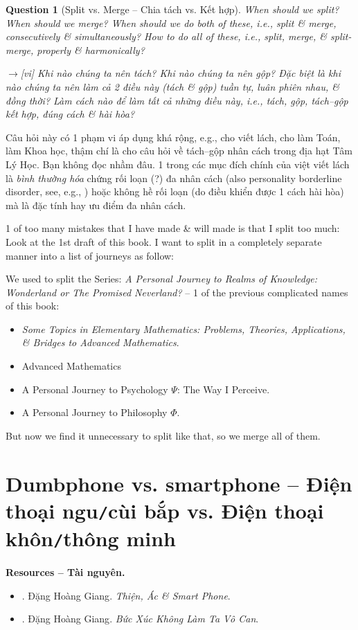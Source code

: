 \documentclass[12pt,oneside]{book}
\newtheorem{question}{Question}
\begin{document}
\begin{question}[Split vs. Merge -- Chia tách vs. Kết hợp]
	When should we split? When should we merge? When should we do both of these, i.e., split \& merge, consecutively \& simultaneously? How to do all of these, i.e., split, merge, \& split-merge, properly \& harmonically?
	
	{\sf[en]$\to$[vi]} Khi nào chúng ta nên tách? Khi nào chúng ta nên gộp? Đặc biệt là khi nào chúng ta nên làm cả 2 điều này (tách \& gộp) tuần tự, luân phiên nhau, \& đồng thời? Làm cách nào để làm tất cả những điều này, i.e., tách, gộp, tách--gộp kết hợp, đúng cách \& hài hòa?
\end{question}
Câu hỏi này có 1 phạm vi áp dụng khá rộng, e.g., cho viết lách, cho làm Toán, làm Khoa học, thậm chí là cho câu hỏi về tách--gộp nhân cách trong địa hạt Tâm Lý Học. Bạn không đọc nhầm đâu. 1 trong các mục đích chính của việt viết lách là {\it bình thường hóa} chứng rối loạn (?) đa nhân cách (also personality borderline disorder, see, e.g., \cite{APA_DSM5}) hoặc không hề rối loạn (do điều khiển được 1 cách hài hòa) mà là đặc tính hay ưu điểm đa nhân cách.

1 of too many mistakes that I have made \& will made is that I split too much: Look at the 1st draft of this book. I want to split in a completely separate manner into a list of journeys as follow:

We used to split the Series: {\it A Personal Journey to Realms of Knowledge: Wonderland or The Promised Neverland?} -- 1 of the previous complicated names of this book:
\begin{itemize}
	\item {\it Some Topics in Elementary Mathematics: Problems, Theories, Applications, \& Bridges to Advanced Mathematics}.
	\item Advanced Mathematics
	\item A Personal Journey to Psychology $\Psi$: The Way I Perceive.
	\item A Personal Journey to Philosophy $\Phi$.
\end{itemize}
But now we find it unnecessary to split like that, so we merge all of them.

\section{Dumbphone vs. smartphone -- Điện thoại ngu{\tt/}cùi bắp vs. Điện thoại khôn{\tt/}thông minh}
\textbf{\textsf{Resources -- Tài nguyên.}}
\begin{itemize}
	\item \cite{Giang_smartphone}. {\sc Đặng Hoàng Giang}. {\it Thiện, Ác \& Smart Phone}.
	\item \cite{Giang_buc_xuc}. {\sc Đặng Hoàng Giang}. {\it Bức Xúc Không Làm Ta Vô Can}.
\end{itemize}
\end{document}
